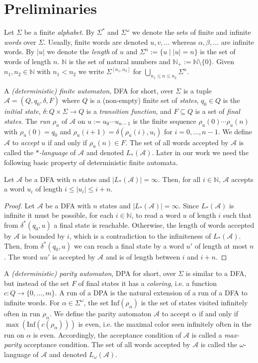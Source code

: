 \documentclass[fleqn,envcountsame]{LMCS}
\newcommand{\aut}[1]{\ensuremath{\mathcal{#1}}}
\newcommand{\LsA}{\ensuremath{L_*(\aut{A})}\xspace}
\newcommand{\LoA}{\ensuremath{L_{\omega}(\aut{A})}\xspace}
\newcommand{\Nat}{\ensuremath{\mathbb{N}}\xspace}
\newcommand{\Natp}{\ensuremath{\mathbb{N}_+}\xspace}
\renewcommand{\S}{\ensuremath{\Sigma}\xspace}
\newcommand{\Sst}{\ensuremath{\Sigma^*}\xspace}
\newcommand{\Som}{\ensuremath{\Sigma^{\omega}}\xspace}
\newcommand{\al}{\ensuremath{\alpha}\xspace}
\newcommand{\ie}{i.e.\xspace}
\newcommand{\Inf}{\mathrm{Inf}}
\begin{document}
\section{Preliminaries}\label{sec:preliminaries}
Let \S be a finite \emph{alphabet}.
By \Sst and \Som we denote the sets of finite and infinite \emph{words} over \S.
Usually, finite words are denoted $u,v,\ldots$ whereas $\al,\beta,\ldots$ are infinite words.
By $|u|$ we denote the \emph{length} of $u$ and
$\S^n:=\{u\mid|u|=n\}$ is the set of words of length $n$.
$\Nat$ is the set of natural numbers and $\Natp:=\Nat\setminus\{0\}$.
Given $n_1,n_2\in\Nat$ with $n_1<n_2$
we write $\S^{[n_1,n_2]}$ for $\bigcup_{n_1\leq n\leq n_2}\S^n$.

A \emph{(deterministic) finite automaton}, DFA for short, over \S is a tuple
$\aut{A}=(Q,q_0,\delta,F)$ where $Q$ is a (non-empty) finite set of
\emph{states}, $q_0\in Q$ is the \emph{initial state}, $\delta:Q\times\S\to Q$
is a \emph{transition function}, and $F\subseteq Q$ is a set of
\emph{final states}. The \emph{run} $\rho_u$ of \aut{A} on $u:=u_0\cdots u_{n-1}$
is the finite sequence $\rho_u(0)\cdots\rho_u(n)$ with $\rho_u(0)=q_0$ and
$\rho_u(i+1)=\delta(\rho_u(i),u_i)$ for $i=0,\ldots,n-1$. We define
\aut{A} to \emph{accept} $u$ if and only if $\rho_u(n)\in F$. The
set of all words accepted by \aut{A} is called the
\emph{$*$-language} of \aut{A} and denoted $L_*(\aut{A})$. Later in
our work we need the following basic property of deterministic
finite automata.

\begin{lem}\label{lem:length}
Let \aut{A} be a DFA with $n$ states and $|\LsA|=\infty$. Then, for all
$i\in\Nat$, \aut{A} accepts a word $u_i$ of length $i\leq|u_i|\leq i+n$.
\end{lem}

\begin{proof}
Let \aut{A} be a DFA with $n$ states and $|\LsA|=\infty$. Since \LsA
is infinite it must be possible, for each $i\in\Nat$, to read a word
$u$ of length $i$ such that from $\delta^*(q_0,u)$ a final state is
reachable. Otherwise, the length of words accepted by \aut{A} is
bounded by $i$, which is a contradiction to the infiniteness of
\LsA. Then, from $\delta^*(q_0,u)$ we can reach a final state by a
word $u'$ of length at most $n$. The word $uu'$ is accepted by \aut{A}
and is of length between $i$ and $i+n$.
\end{proof}

A \emph{(deterministic) parity automaton}, DPA for short,
over \S is similar to a DFA, but instead of the set $F$ of final
states it has a \emph{coloring}, \ie a function $c : Q \to \{0,\ldots,m\}$.
A run of a DPA is the natural extension of a run of a DFA to infinite words.
For $\al\in\Som$, the set $\Inf(\rho_{\al})$ is
the set of states visited infinitely often in run $\rho_{\al}$.
We define the parity automaton \aut{A} to accept $\al$ if and only if
$\max(\Inf(c(\rho_{\al})))$ is even, \ie the maximal color seen
infinitely often in the run on $\al$ is even. Accordingly, the
acceptance condition of \aut{A} is called a \emph{max-parity}
acceptance condition. The set of all words accepted by \aut{A} is
called the $\omega$-language of \aut{A} and denoted \LoA.
\end{document}
